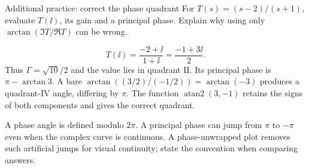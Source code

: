 \begin{question}{Additional practice: correct the phase quadrant}
For $T(s)=(s-2)/(s+1)$, evaluate $T(\ii)$, its gain and a principal phase. Explain why using only $\arctan(\Im T/\Re T)$ can be wrong.
\end{question}
\begin{answer}
\[T(\ii)=\frac{-2+\ii}{1+\ii}=\frac{-1+3\ii}{2}.\]
Thus $\Gamma=\sqrt{10}/2$ and the value lies in quadrant II. Its principal phase is $\pi-\arctan3$. A bare $\arctan((3/2)/(-1/2))=\arctan(-3)$ produces a quadrant-IV angle, differing by $\pi$. The function \(\operatorname{atan2}(3,-1)\) retains the signs of both components and gives the correct quadrant.
\end{answer}
\begin{tip}
A phase angle is defined modulo $2\pi$. A principal phase can jump from $\pi$ to $-\pi$ even when the complex curve is continuous. A phase-unwrapped plot removes such artificial jumps for visual continuity; state the convention when comparing answers.
\end{tip}


